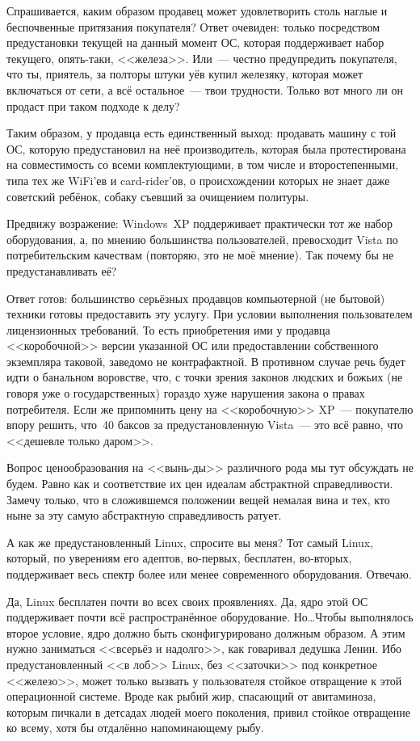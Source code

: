 Спрашивается, каким образом продавец может удовлетворить столь наглые и беспочвенные притязания покупателя? Ответ очевиден: только посредством предустановки текущей на данный момент ОС, которая поддерживает набор текущего, опять-таки, <<железа>>. Или~--- честно предупредить покупателя, что ты, приятель, за полторы штуки уёв купил железяку, которая может включаться от сети, а всё остальное~--- твои трудности. Только вот много ли он продаст при таком подходе к делу?

Таким образом, у продавца есть единственный выход: продавать машину с той ОС, которую предустановил на неё производитель, которая была протестирована на совместимость со всеми комплектующими, в том числе и второстепенными, типа тех же WiFi'ев и card-rider'ов, о происхождении которых не знает даже советский ребёнок, собаку съевший за очищением политуры.

Предвижу возражение: Windows~XP поддерживает практически тот же набор оборудования, а, по мнению большинства пользователей, превосходит Vista по потребительским качествам (повторяю, это не моё мнение). Так почему бы не предустанавливать её?

Ответ готов: большинство серьёзных продавцов компьютерной (не бытовой) техники готовы предоставить эту услугу. При условии выполнения пользователем лицензионных требований. То есть приобретения ими у продавца <<коробочной>> версии указанной ОС или предоставлении собственного экземпляра таковой, заведомо не контрафактной. В противном случае речь будет идти о банальном воровстве, что, с точки зрения законов людских и божьих (не говоря уже о государственных) гораздо хуже нарушения закона о правах потребителя. Если же припомнить цену на <<коробочную>> XP~--- покупателю впору решить, что~40 баксов за предустановленную Vista~--- это всё равно, что <<дешевле только даром>>.

Вопрос ценообразования на <<вынь-ды>> различного рода мы тут обсуждать не будем. Равно как и соответствие их цен идеалам абстрактной справедливости. Замечу только, что в сложившемся положении вещей немалая вина и тех, кто ныне за эту самую абстрактную справедливость ратует.

А как же предустановленный Linux, спросите вы меня? Тот самый Linux, который, по уверениям его адептов, во-первых, бесплатен, во-вторых, поддерживает весь спектр более или менее современного оборудования. Отвечаю.

Да, Linux бесплатен почти во всех своих проявлениях. Да, ядро этой ОС поддерживает почти всё распространённое оборудование. Но\dots Чтобы выполнялось второе условие, ядро должно быть сконфигурировано должным образом. А этим нужно заниматься <<всерьёз и надолго>>, как говаривал дедушка Ленин. Ибо предустановленный <<в лоб>> Linux, без <<заточки>> под конкретное <<железо>>, может только вызвать у пользователя стойкое отвращение к этой операционной системе. Вроде как рыбий жир, спасающий от авитаминоза, которым пичкали в детсадах людей моего поколения, привил стойкое отвращение ко всему, хотя бы отдалённо напоминающему рыбу.

